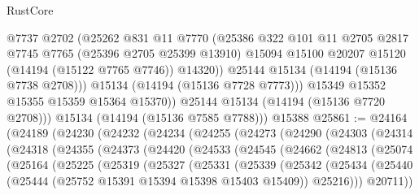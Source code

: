 \begin{lexlean}{RustCore}
\begin{coremodule}
                @7737
                @2702
                (@25262
                  @831
                  @11
                  @7770
                  (@25386
                    @322
                    @101
                    @11
                    @2705
                    @2817
                    @7745
                    @7765
                    (@25396 @2705 @25399 @13910)
                    @15094
                    @15100
                    @20207
                    @15120
                    (@14194 (@15122 @7765 @7746))
                    @14320))
                @25144
                @15134
                (@14194 (@15136 @7738 @2708)))
              @15134
              (@14194 (@15136 @7728 @7773)))
            @15349
            @15352
            @15355
            @15359
            @15364
            @15370))
        @25144
        @15134
        (@14194 (@15136 @7720 @2708)))
      @15134
      (@14194 (@15136 @7585 @7788)))
    @15388
@25861 := @24164
    (@24189
      (@24230
        (@24232
          (@24234
            (@24255
              (@24273
                (@24290
                  (@24303
                    (@24314
                      (@24318
                        (@24355
                          (@24373
                            (@24420
                              (@24533
                                (@24545
                                  (@24662
                                    (@24813
                                      (@25074
                                        (@25164
                                          (@25225
                                            (@25319
                                              (@25327
                                                (@25331
                                                  (@25339
                                                    (@25342
                                                      (@25434
                                                        (@25440
                                                          (@25444
                                                            (@25752
                                                              @15391
                                                              @15394
                                                              @15398
                                                              @15403
                                                              @15409))
                                                          @25216)))
                                                    @20711))

\end{coremodule}
\end{lexlean}
